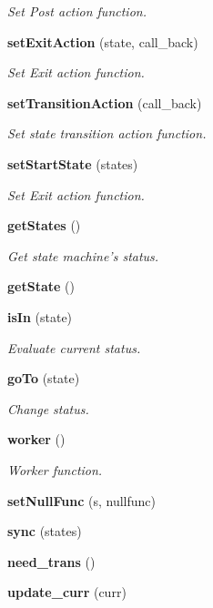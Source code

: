 \begin{CompactItemize}
\begin{CompactList}\small\item\em Set Post action function. \item\end{CompactList}\item 
{\bf set\-Exit\-Action} (state, call\_\-back)
\begin{CompactList}\small\item\em Set Exit action function. \item\end{CompactList}\item 
{\bf set\-Transition\-Action} (call\_\-back)
\begin{CompactList}\small\item\em Set state transition action function. \item\end{CompactList}\item 
{\bf set\-Start\-State} (states)
\begin{CompactList}\small\item\em Set Exit action function. \item\end{CompactList}\item 
{\bf get\-States} ()
\begin{CompactList}\small\item\em Get state machine's status. \item\end{CompactList}\item 
{\bf get\-State} ()
\item 
{\bf is\-In} (state)
\begin{CompactList}\small\item\em Evaluate current status. \item\end{CompactList}\item 
{\bf go\-To} (state)
\begin{CompactList}\small\item\em Change status. \item\end{CompactList}\item 
{\bf worker} ()
\begin{CompactList}\small\item\em Worker function. \item\end{CompactList}\item 
{\bf set\-Null\-Func} (s, nullfunc)
\item 
{\bf sync} (states)
\item 
{\bf need\_\-trans} ()
\item 
{\bf update\_\-curr} (curr)
\end{CompactItemize}


